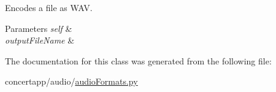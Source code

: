 Encodes a file as WAV. 


\begin{DoxyParams}{Parameters}
{\em self} & \\
\hline
{\em outputFileName} & \\
\hline
\end{DoxyParams}


The documentation for this class was generated from the following file:\begin{DoxyCompactItemize}
\item 
concertapp/audio/\hyperlink{audio_formats_8py}{audioFormats.py}\end{DoxyCompactItemize}
